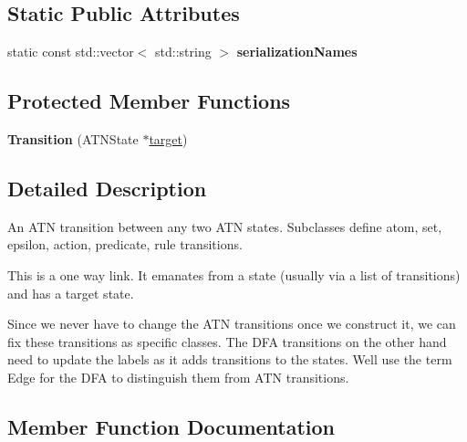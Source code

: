\subsection*{Static Public Attributes}
\begin{DoxyCompactItemize}
\item 
static const std\+::vector$<$ std\+::string $>$ {\bfseries serialization\+Names}
\end{DoxyCompactItemize}
\subsection*{Protected Member Functions}
\begin{DoxyCompactItemize}
\item 
\mbox{\label{classantlr4_1_1atn_1_1Transition_a46f1588fb7eddb745625b03a21b0fbcb}} 
{\bfseries Transition} (A\+T\+N\+State $\ast$\hyperlink{classantlr4_1_1atn_1_1Transition_aaaed7f4ddda71e156b36de33e88f66a7}{target})
\end{DoxyCompactItemize}


\subsection{Detailed Description}
An A\+TN transition between any two A\+TN states. Subclasses define atom, set, epsilon, action, predicate, rule transitions. 

This is a one way link. It emanates from a state (usually via a list of transitions) and has a target state. 

Since we never have to change the A\+TN transitions once we construct it, we can fix these transitions as specific classes. The D\+FA transitions on the other hand need to update the labels as it adds transitions to the states. We\textquotesingle{}ll use the term Edge for the D\+FA to distinguish them from A\+TN transitions. 



\subsection{Member Function Documentation}
\mbox{\label{classantlr4_1_1atn_1_1Transition_a8e712c7a46586d73c054c56f481b1be7}} 

